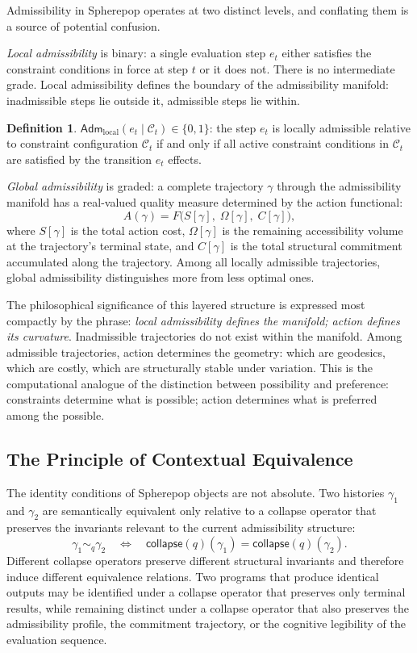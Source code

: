 \documentclass[12pt,openany]{book}
\theoremstyle{plain}
\theoremstyle{definition}
\newtheorem{definition}[theorem]{Definition}
\theoremstyle{remark}
\newcommand{\scollapse}[1]{\mathsf{collapse}\!\left(#1\right)}
\begin{document}
Admissibility in Spherepop operates at two distinct levels, and conflating them is a source of potential confusion.

\emph{Local admissibility} is binary: a single evaluation step $e_t$ either satisfies the constraint conditions in force at step $t$ or it does not. There is no intermediate grade. Local admissibility defines the boundary of the admissibility manifold: inadmissible steps lie outside it, admissible steps lie within.

\begin{definition}
$\mathsf{Adm}_{\mathrm{local}}(e_t \mid \mathcal{C}_t) \in \{0, 1\}$: the step $e_t$ is locally admissible relative to constraint configuration $\mathcal{C}_t$ if and only if all active constraint conditions in $\mathcal{C}_t$ are satisfied by the transition $e_t$ effects.
\end{definition}

\emph{Global admissibility} is graded: a complete trajectory $\gamma$ through the admissibility manifold has a real-valued quality measure determined by the action functional:
\[
  A(\gamma) = F\bigl(S[\gamma],\; \Omega[\gamma],\; C[\gamma]\bigr),
\]
where $S[\gamma]$ is the total action cost, $\Omega[\gamma]$ is the remaining accessibility volume at the trajectory's terminal state, and $C[\gamma]$ is the total structural commitment accumulated along the trajectory. Among all locally admissible trajectories, global admissibility distinguishes more from less optimal ones.

The philosophical significance of this layered structure is expressed most compactly by the phrase: \emph{local admissibility defines the manifold; action defines its curvature}. Inadmissible trajectories do not exist within the manifold. Among admissible trajectories, action determines the geometry: which are geodesics, which are costly, which are structurally stable under variation. This is the computational analogue of the distinction between possibility and preference: constraints determine what is possible; action determines what is preferred among the possible.

\subsection*{The Principle of Contextual Equivalence}

The identity conditions of Spherepop objects are not absolute. Two histories $\gamma_1$ and $\gamma_2$ are semantically equivalent only relative to a collapse operator that preserves the invariants relevant to the current admissibility structure:
\[
  \gamma_1 \sim_q \gamma_2 \quad \Longleftrightarrow \quad \scollapse{q}(\gamma_1) = \scollapse{q}(\gamma_2).
\]
Different collapse operators preserve different structural invariants and therefore induce different equivalence relations. Two programs that produce identical outputs may be identified under a collapse operator that preserves only terminal results, while remaining distinct under a collapse operator that also preserves the admissibility profile, the commitment trajectory, or the cognitive legibility of the evaluation sequence.
\end{document}
